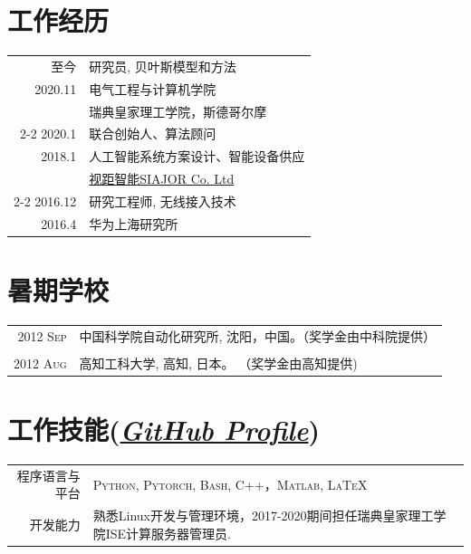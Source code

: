 \documentclass[a4paper,10pt]{article}
\begin{document}
\section{工作经历}
\begin{tabular}{r|p{12cm}}
  \textsc{至今}  & 研究员, 贝叶斯模型和方法 \\
  \textsc{2020.11}  &{电气工程与计算机学院}  \\
& 瑞典皇家理工学院，斯德哥尔摩\\
  \cline{2-2}
  \textsc{2020.1}  & 联合创始人、算法顾问 \\
	\textsc{2018.1}& 人工智能系统方案设计、智能设备供应 \\
		& \href{http://www.siajor.com/}{视距智能SIAJOR Co. Ltd} \\
  \cline{2-2}
    \textsc{2016.12}  & 研究工程师, 无线接入技术  \\
  \textsc{2016.4}  & 华为上海研究所 \\
\end{tabular}


\section{暑期学校}
\begin{tabular}{r|p{13cm}}

  \textsc{2012 Sep}  & 中国科学院自动化研究所, 沈阳，中国。（奖学金由中科院提供） \\

  \multicolumn{1}{c}{}\\
  \textsc{2012 Aug}  & 高知工科大学, 高知, 日本。 （奖学金由高知提供) \\
\end{tabular}


\section{工作技能(\href{https://github.com/FirstHandScientist}{\textit{GitHub Profile}})}

\begin{tabular}{r|p{12cm}}
	程序语言与平台 & \textsc{Python, Pytorch, Bash, C++，Matlab, \LaTeX}  \vspace{5pt}\\
	开发能力 & 熟悉Linux开发与管理环境，2017-2020期间担任瑞典皇家理工学院ISE计算服务器管理员.

\end{tabular}
\end{document}
